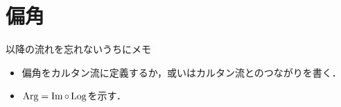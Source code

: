 \section{偏角}
	\begin{itembox}[l]{以降の流れを忘れないうちにメモ}
		\begin{itemize}
			\item 偏角をカルタン流に定義するか，或いはカルタン流とのつながりを書く．
			\item $\operatorname{Arg} = \operatorname{Im} \circ \operatorname{Log}$を示す．
		\end{itemize}
	\end{itembox}
	